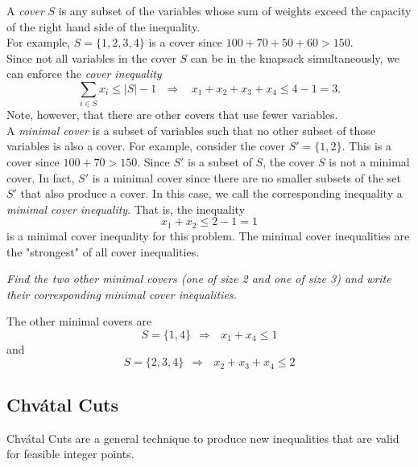 A \emph{cover} $S$ is any subset of the variables whose sum of weights exceed the capacity of the right hand side of the inequality.\\
For example, $S = \{1,2,3,4\}$ is a cover since $100 + 70 + 50 + 60 > 150$.\\
Since not all variables in the cover $S$ can be in the knapsack simultaneously, we can enforce the \emph{cover inequality}
\begin{equation}
\sum_{i \in S} x_i \leq |S| - 1 \ \ \ \Rightarrow \ \ \ \ x_1 + x_2 + x_3 + x_4 \leq 4 - 1 = 3.
\end{equation}
Note, however, that there are other covers that use fewer variables.\\

A \emph{minimal cover} is a subset of variables such that no other subset of those variables is also a cover.  For example, consider the cover $S' = \{1,2\}$.  This is a cover since $100 + 70 > 150$.  Since $S'$ is a subset of $S$, the cover $S$ is not a minimal cover.  In fact, $S'$ is a minimal cover since there are no smaller subsets of the set $S'$ that also produce a cover.
In this case, we call the corresponding inequality a \emph{minimal cover inequality}.  That is, the inequality
\begin{equation}
x_1 + x_2 \leq 2 - 1 = 1
\end{equation}
is a minimal cover inequality for this problem.   The minimal cover inequalities are the "strongest" of all cover inequalities.

\emph{Find the two other minimal covers (one of size 2 and one of size 3) and write their corresponding minimal cover inequalities.}

\begin{solution}{}{}{}
The other minimal covers are 
\begin{equation}
S = \{1,4\} \ \ \Rightarrow \ \ \ x_1 + x_4 \leq 1
\end{equation}
and
\begin{equation}
S = \{2,3,4\} \ \ \Rightarrow \ \ \ x_2 + x_3 + x_4 \leq 2
\end{equation}
\end{solution}





\subsection{Chv\'atal Cuts}


Chv\'atal Cuts are a general technique to produce new inequalities that are valid for feasible integer points.  


